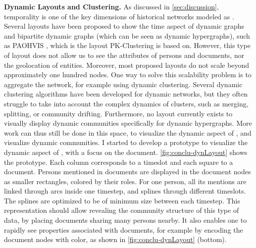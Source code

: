 \noindent\textbf{Dynamic Layouts and Clustering.} As discussed in \autoref{sec:discussion}, temporality is one of the key dimensions of historical networks modeled as \modelplural.
Several layouts have been proposed to show the time aspect of dynamic graphs\cite{brandesAsymmetricRelationsLongitudinal2011, bachVisualizingDynamicNetworks2014} and bipartite dynamic graphs (which can be seen as dynamic hypergraphs), such as PAOHVIS \cite{valdiviaAnalyzingDynamicHypergraphs2021}, which is the layout PK-Clustering is based on.
However, this type of layout does not allow us to see the attributes of persons and documents, nor the geolocation of entities.
Moreover, most proposed layouts do not scale beyond approximately one hundred nodes.
One way to solve this scalability problem is to aggregate the network, for example using dynamic clustering.
Several dynamic clustering algorithms have been developed for dynamic networks, but they often struggle to take into account the complex dynamics of clusters, such as merging, splitting, or community drifting.
Furthermore, no layout currently exists to visually display dynamic communities specifically for dynamic hypergraphs.
More work can thus still be done in this space, to visualize the dynamic aspect of \modelplural, and visualize dynamic communities.
I started to develop a prototype to visualize the dynamic aspect of \modelplural, with a focus on the document.
\autoref{fig:conclu-dynLayout} shows the prototype.
Each column corresponds to a timeslot and each square to a document.
Persons mentioned in documents are displayed in the document nodes as smaller rectangles, colored by their roles.
For one person, all its mentions are linked through arcs inside one timestep, and splines through different timeslots.
The splines are optimized to be of minimum size between each timestep.
This representation should allow revealing the community structure of this type of data, by placing documents sharing many persons nearby.
It also enables one to rapidly see properties associated with documents, for example by encoding the document nodes with color, as shown in \autoref{fig:conclu-dynLayout} (bottom).

